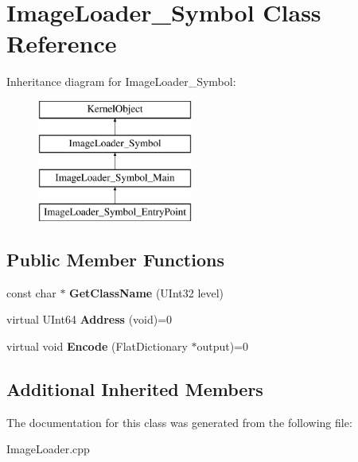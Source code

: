 \hypertarget{class_image_loader___symbol}{}\section{Image\+Loader\+\_\+\+Symbol Class Reference}
\label{class_image_loader___symbol}
Inheritance diagram for Image\+Loader\+\_\+\+Symbol\+:\begin{figure}[H]
\begin{center}
\leavevmode
\includegraphics[height=4.000000cm]{class_image_loader___symbol}
\end{center}
\end{figure}
\subsection*{Public Member Functions}
\begin{DoxyCompactItemize}
\item 
\mbox{\label{class_image_loader___symbol_a8db8b1bb8b68a4e01b6958a732c1f42f}} 
const char $\ast$ {\bfseries Get\+Class\+Name} (U\+Int32 level)
\item 
\mbox{\label{class_image_loader___symbol_a987681bd76930d8f7c520d8281469e36}} 
virtual U\+Int64 {\bfseries Address} (void)=0
\item 
\mbox{\label{class_image_loader___symbol_a443e7ff4ca62518a6ad9308cef438e0a}} 
virtual void {\bfseries Encode} (Flat\+Dictionary $\ast$output)=0
\end{DoxyCompactItemize}
\subsection*{Additional Inherited Members}


The documentation for this class was generated from the following file\+:\begin{DoxyCompactItemize}
\item 
Image\+Loader.\+cpp\end{DoxyCompactItemize}
